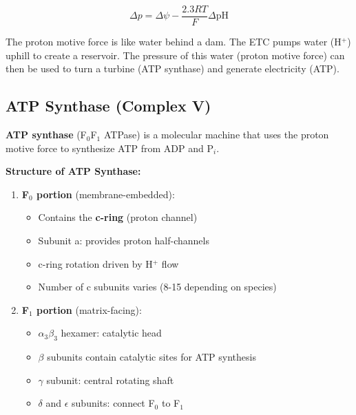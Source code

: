 \[
\Delta p = \Delta\psi - \frac{2.3RT}{F}\Delta\text{pH}
\]

\begin{analogy}
The proton motive force is like water behind a dam. The ETC pumps water (H$^+$) uphill to create a reservoir. The pressure of this water (proton motive force) can then be used to turn a
turbine (ATP synthase) and generate electricity (ATP).
\end{analogy}

\subsection{ATP Synthase (Complex V)}

\begin{definition}
\textbf{ATP synthase} (F$_0$F$_1$ ATPase) is a molecular machine that uses the proton motive force to synthesize ATP from ADP and P$_i$.
\end{definition}

\textbf{Structure of ATP Synthase:}

\begin{enumerate}
    \item \textbf{F$_0$ portion} (membrane-embedded):
    \begin{itemize}
        \item Contains the \textbf{c-ring} (proton channel)
        \item Subunit a: provides proton half-channels
        \item c-ring rotation driven by H$^+$ flow
        \item Number of c subunits varies (8-15 depending on species)
    \end{itemize}
    
    \item \textbf{F$_1$ portion} (matrix-facing):
    \begin{itemize}
        \item $\alpha_3\beta_3$ hexamer: catalytic head
        \item $\beta$ subunits contain catalytic sites for ATP synthesis
        \item $\gamma$ subunit: central rotating shaft
        \item $\delta$ and $\epsilon$ subunits: connect F$_0$ to F$_1$
    \end{itemize}
\end{enumerate}

